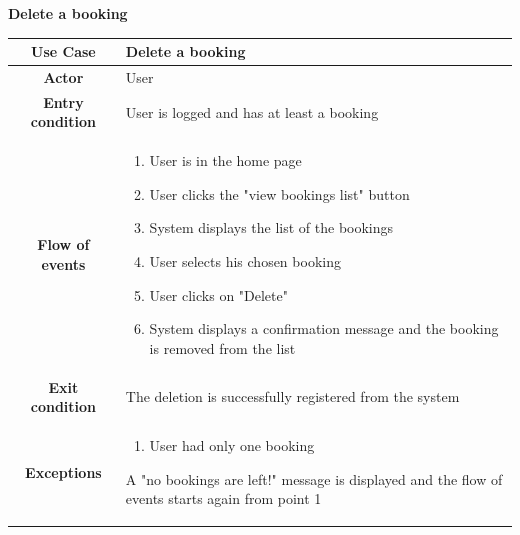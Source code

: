 \documentclass[table, 12pt]{article} %
\begin{document}
\begin{itemize}
            \begin{table}[H]
                \item[] \textbf{Delete a booking}
                \item[]
                \centering
                \begin{tabular}{|c |m{}|}
                    \hline
                    \textbf{Use Case} & Delete a booking\\ \hline
                    \textbf{Actor} & User\\ \hline
                    \textbf{Entry condition} & User is logged and has at least a booking\\  \hline
                    \textbf{Flow of events} & \begin{enumerate}
                                                \item User is in the home page
                                                \item User clicks the "view bookings list" button
                                                \item System displays the list of the bookings
                                                \item User selects his chosen booking
                                                \item User clicks on "Delete"
                                                \item System displays a confirmation message and the booking is removed from the list
                                            \end{enumerate}\\ \hline
                    \textbf{Exit condition} & The deletion is successfully registered from the system  \\ \hline
                    \textbf{Exceptions} &  \begin{enumerate}
                        \item User had only one booking
                    \end{enumerate}
                    A "no bookings are left!" message is displayed and the flow of events starts again from point 1\\ \hline
                \end{tabular}
            \end{table}


\end{itemize}
\end{document}
